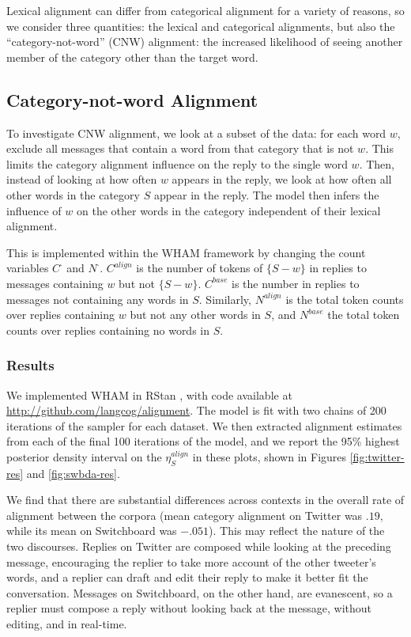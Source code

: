 \documentclass[11pt]{article}
\begin{document}
Lexical alignment can differ from categorical alignment for a variety of reasons, so we consider three quantities: the lexical and categorical alignments, but also the ``category-not-word'' (CNW) alignment: the increased likelihood of seeing another member of the category other than the target word.

\subsection{Category-not-word Alignment}

To investigate CNW alignment, we look at a subset of the data: for each word $w$, exclude all messages that contain a word from that category that is not $w$. This limits the category alignment influence on the reply to the single word $w$. Then, instead of looking at how often $w$ appears in the reply, we look at how often all other words in the category $S$ appear in the reply.  The model then infers the influence of $w$ on the other words in the category independent of their lexical alignment.

This is implemented within the WHAM framework by changing the count variables $C^\cdot$ and $N^\cdot$. $C^{align}$ is the number of tokens of $\{S-w\}$ in replies to messages containing $w$ but not $\{S - w\}$. $C^{base}$ is the number in replies to messages not containing any words in $S$.  Similarly, $N^{align}$ is the total token counts over replies containing $w$ but not any other words in $S$, and $N^{base}$ the total token counts over replies containing no words in $S$.

\subsubsection{Results}
We implemented WHAM in RStan \cite{Stan}, with code available at \url{http://github.com/langcog/alignment}. The model is fit with two chains of 200 iterations of the sampler for each dataset.  We then extracted alignment estimates from each of the final 100 iterations of the model, and we report the 95\% highest posterior density interval on the $\eta^{align}_S$ in these plots, shown in Figures \ref{fig:twitter-res} and \ref{fig:swbda-res}.

We find that there are substantial differences across contexts in the overall rate of alignment between the corpora (mean category alignment on Twitter was $.19$, while its mean on Switchboard was $-.051$). This may reflect the nature of the two discourses. Replies on Twitter are composed while looking at the preceding message, encouraging the replier to take more account of the other tweeter's words, and a replier can draft and edit their reply to make it better fit the conversation.  Messages on Switchboard, on the other hand, are evanescent, so a replier must compose a reply without looking back at the message, without editing, and in real-time.  %
\end{document}
